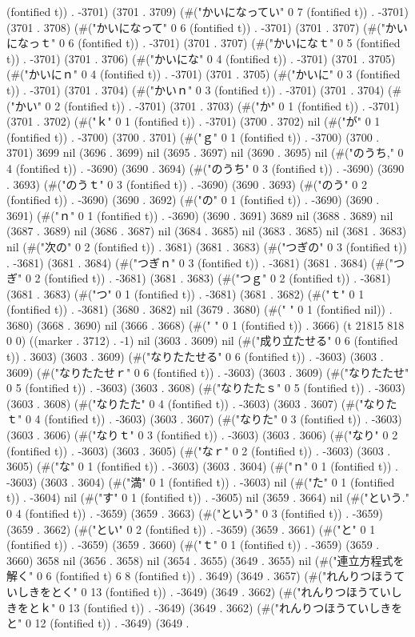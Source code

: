 (fontified t)) . -3701) (3701 . 3709) (#("かいになってい" 0 7 (fontified t)) . -3701) (3701 . 3708) (#("かいになって" 0 6 (fontified t)) . -3701) (3701 . 3707) (#("かいになっｔ" 0 6 (fontified t)) . -3701) (3701 . 3707) (#("かいになｔ" 0 5 (fontified t)) . -3701) (3701 . 3706) (#("かいにな" 0 4 (fontified t)) . -3701) (3701 . 3705) (#("かいにｎ" 0 4 (fontified t)) . -3701) (3701 . 3705) (#("かいに" 0 3 (fontified t)) . -3701) (3701 . 3704) (#("かいｎ" 0 3 (fontified t)) . -3701) (3701 . 3704) (#("かい" 0 2 (fontified t)) . -3701) (3701 . 3703) (#("か" 0 1 (fontified t)) . -3701) (3701 . 3702) (#("ｋ" 0 1 (fontified t)) . -3701) (3700 . 3702) nil (#("が" 0 1 (fontified t)) . -3700) (3700 . 3701) (#("ｇ" 0 1 (fontified t)) . -3700) (3700 . 3701) 3699 nil (3696 . 3699) nil (3695 . 3697) nil (3690 . 3695) nil (#("のうち," 0 4 (fontified t)) . -3690) (3690 . 3694) (#("のうち" 0 3 (fontified t)) . -3690) (3690 . 3693) (#("のうｔ" 0 3 (fontified t)) . -3690) (3690 . 3693) (#("のう" 0 2 (fontified t)) . -3690) (3690 . 3692) (#("の" 0 1 (fontified t)) . -3690) (3690 . 3691) (#("ｎ" 0 1 (fontified t)) . -3690) (3690 . 3691) 3689 nil (3688 . 3689) nil (3687 . 3689) nil (3686 . 3687) nil (3684 . 3685) nil (3683 . 3685) nil (3681 . 3683) nil (#("次の" 0 2 (fontified t)) . 3681) (3681 . 3683) (#("つぎの" 0 3 (fontified t)) . -3681) (3681 . 3684) (#("つぎｎ" 0 3 (fontified t)) . -3681) (3681 . 3684) (#("つぎ" 0 2 (fontified t)) . -3681) (3681 . 3683) (#("つｇ" 0 2 (fontified t)) . -3681) (3681 . 3683) (#("つ" 0 1 (fontified t)) . -3681) (3681 . 3682) (#("ｔ" 0 1 (fontified t)) . -3681) (3680 . 3682) nil (3679 . 3680) (#(" " 0 1 (fontified nil)) . 3680) (3668 . 3690) nil (3666 . 3668) (#(" " 0 1 (fontified t)) . 3666) (t 21815 818 0 0) ((marker . 3712) . -1) nil (3603 . 3609) nil (#("成り立たせる" 0 6 (fontified t)) . 3603) (3603 . 3609) (#("なりたたせる" 0 6 (fontified t)) . -3603) (3603 . 3609) (#("なりたたせｒ" 0 6 (fontified t)) . -3603) (3603 . 3609) (#("なりたたせ" 0 5 (fontified t)) . -3603) (3603 . 3608) (#("なりたたｓ" 0 5 (fontified t)) . -3603) (3603 . 3608) (#("なりたた" 0 4 (fontified t)) . -3603) (3603 . 3607) (#("なりたｔ" 0 4 (fontified t)) . -3603) (3603 . 3607) (#("なりた" 0 3 (fontified t)) . -3603) (3603 . 3606) (#("なりｔ" 0 3 (fontified t)) . -3603) (3603 . 3606) (#("なり" 0 2 (fontified t)) . -3603) (3603 . 3605) (#("なｒ" 0 2 (fontified t)) . -3603) (3603 . 3605) (#("な" 0 1 (fontified t)) . -3603) (3603 . 3604) (#("ｎ" 0 1 (fontified t)) . -3603) (3603 . 3604) (#("満" 0 1 (fontified t)) . -3603) nil (#("た" 0 1 (fontified t)) . -3604) nil (#("す" 0 1 (fontified t)) . -3605) nil (3659 . 3664) nil (#("という." 0 4 (fontified t)) . -3659) (3659 . 3663) (#("という" 0 3 (fontified t)) . -3659) (3659 . 3662) (#("とい" 0 2 (fontified t)) . -3659) (3659 . 3661) (#("と" 0 1 (fontified t)) . -3659) (3659 . 3660) (#("ｔ" 0 1 (fontified t)) . -3659) (3659 . 3660) 3658 nil (3656 . 3658) nil (3654 . 3655) (3649 . 3655) nil (#("連立方程式を解く" 0 6 (fontified t) 6 8 (fontified t)) . 3649) (3649 . 3657) (#("れんりつほうていしきをとく" 0 13 (fontified t)) . -3649) (3649 . 3662) (#("れんりつほうていしきをとｋ" 0 13 (fontified t)) . -3649) (3649 . 3662) (#("れんりつほうていしきをと" 0 12 (fontified t)) . -3649) (3649 . 